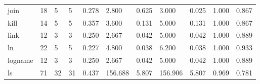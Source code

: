 \begin{longtable}{lp{1.2cm}p{1.2cm}p{1.2cm}p{1.2cm}p{1.2cm}p{1.2cm}p{1.2cm}p{1.2cm}p{1.2cm}p{1.2cm}}
join      &                           18 &                  5 &                                 5 &                                      0.278 &                                  2.800 &                                        0.625 &                             3.000 &                                   0.025 &                              1.000 &                                              0.867 \\
kill      &                           14 &                  5 &                                 5 &                                      0.357 &                                  3.600 &                                        0.131 &                             5.000 &                                   0.131 &                              1.000 &                                              0.867 \\
link      &                           12 &                  3 &                                 3 &                                      0.250 &                                  2.667 &                                        0.042 &                             5.000 &                                   0.042 &                              1.000 &                                              0.889 \\
ln        &                           22 &                  5 &                                 5 &                                      0.227 &                                  4.800 &                                        0.038 &                             6.200 &                                   0.038 &                              1.000 &                                              0.933 \\
logname   &                           12 &                  3 &                                 3 &                                      0.250 &                                  2.667 &                                        0.042 &                             5.000 &                                   0.042 &                              1.000 &                                              0.889 \\
ls        &                           71 &                 32 &                                31 &                                      0.437 &                                156.688 &                                        5.807 &                           156.906 &                                   5.807 &                              0.969 &                                              0.781 \\

\end{longtable}
